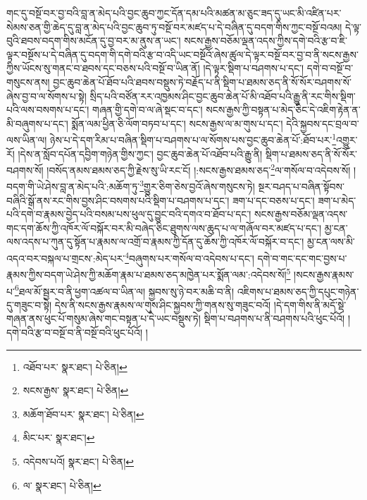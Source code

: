 གང་དུ་བསྔོ་བར་བྱ་བའི་བླ་ན་མེད་པའི་བྱང་ཆུབ་ཀྱང་དོན་དམ་པའི་མཚན་མ་ཅུང་ཟད་དུ་ཡང་མི་འཛིན་པར་སེམས་ཅན་གྱི་ཆེད་དུ་བླ་ན་མེད་པའི་བྱང་ཆུབ་ཏུ་བསྔོ་བར་མཛད་པ་དེ་བཞིན་དུ་བདག་གིས་ཀྱང་བསྔོ་བའམ། དེ་ལྟ་བུའི་ཐབས་བདག་གིས་མངོན་དུ་བྱ་བར་མ་ནུས་ན་ཡང་། སངས་རྒྱས་བཅོམ་ལྡན་འདས་ཀྱིས་དགེ་བའི་རྩ་བ་ཇི་ལྟར་བསྔོས་པ་དེ་བཞིན་དུ་བདག་གི་དགེ་བའི་རྩ་བ་འདི་ཡང་བསྔོའོ་ཞེས་ཚུལ་དེ་ལྟར་བསྔོ་བར་བྱ་བ་ནི་སངས་རྒྱས་ཀྱིས་ཡོངས་སུ་གནང་བ་ཐབས་དང་བཅས་པའི་བསྔོ་བ་ཡིན་ནོ། །དེ་ལྟར་སྡིག་པ་བཤགས་པ་དང་། དགེ་བ་བསྔོ་བ་གསུངས་ནས། བྱང་ཆུབ་ཆེན་པོ་ཐོབ་པའི་ཐབས་བསྡུས་ཏེ་བརྗོད་པ་ནི་སྡིག་པ་ཐམས་ཅད་ནི་སོ་སོར་བཤགས་སོ་ཞེས་བྱ་བ་ལ་སོགས་པ་སྟེ། སྲིད་པའི་བཙོན་རར་འཁྱམས་ཤིང་བྱང་ཆུབ་ཆེན་པོ་མི་འཐོབ་པའི་རྒྱུ་ནི་རང་གིས་སྡིག་པའི་ལས་བསགས་པ་དང་། གཞན་གྱི་དགེ་བ་ལ་ཞེ་སྡང་བ་དང་། སངས་རྒྱས་ཀྱི་བསྟན་པ་མེད་ཅིང་དེ་འཇིག་རྟེན་ན་མི་བཞུགས་པ་དང་། སྨོན་ལམ་ཕྱིན་ཅི་ལོག་བཏབ་པ་དང་། སངས་རྒྱས་ལ་མ་གུས་པ་དང་། དེའི་སྐྱབས་དང་བྲལ་བ་ལས་ཡིན་ལ། ཉེས་པ་དེ་དག་རིམ་པ་བཞིན་སྡིག་པ་བཤགས་པ་ལ་སོགས་པས་བྱང་ཆུབ་ཆེན་པོ་:ཐོབ་པར་\footnote{འཐོབ་པར་  སྣར་ཐང་།  པེ་ཅིན། }འགྱུར་རོ། །དེས་ན་སློབ་དཔོན་དབྱིག་གཉེན་གྱིས་ཀྱང་། བྱང་ཆུབ་ཆེན་པོ་འཐོབ་པའི་རྒྱུ་ནི། སྡིག་པ་ཐམས་ཅད་ནི་སོ་སོར་བཤགས་སོ། །བསོད་ནམས་ཐམས་ཅད་ཀྱི་རྗེས་སུ་ཡི་རང་ངོ། །:སངས་རྒྱས་ཐམས་ཅད་\footnote{སངས་རྒྱས་  སྣར་ཐང་།  པེ་ཅིན། }ལ་གསོལ་བ་འདེབས་སོ། །བདག་གི་ཡེ་ཤེས་བླ་ན་མེད་པའི་:མཆོག་ཏུ་\footnote{མཆོག་ཐོབ་པར་  སྣར་ཐང་།  པེ་ཅིན། }གྱུར་ཅིག་ཅེས་བྱའོ་ཞེས་གསུངས་ཏེ། སྔར་བཤད་པ་བཞིན་སྟོབས་བཞིའི་སྒོ་ནས་རང་གིས་བྱས་ཤིང་བསགས་པའི་སྡིག་པ་བཤགས་པ་དང་། ཟག་པ་དང་བཅས་པ་དང་། ཟག་པ་མེད་པའི་དགེ་བ་རྣམས་བྱེད་པའི་བསམ་པས་ཕུལ་དུ་བྱུང་བའི་དགའ་བ་ཐོབ་པ་དང་། སངས་རྒྱས་བཅོམ་ལྡན་འདས་གང་དག་ཆོས་ཀྱི་འཁོར་ལོ་བསྐོར་བར་མི་བཞེད་ཅིང་ཐུགས་ལས་ཆུད་པ་ལ་གཞོལ་བར་མཛད་པ་དང་། མྱ་ངན་ལས་འདས་པ་ཀུན་དུ་སྟོན་པ་རྣམས་ལ་འགྲོ་བ་རྣམས་ཀྱི་དོན་དུ་ཆོས་ཀྱི་འཁོར་ལོ་བསྐོར་བ་དང་། མྱ་ངན་ལས་མི་འདའ་བར་བསྐལ་པ་གྲངས་:མེད་པར་\footnote{མིང་པར་  སྣར་ཐང་། }བཞུགས་པར་གསོལ་བ་འདེབས་པ་དང་། དགེ་བ་གང་དང་གང་བྱས་པ་རྣམས་ཀྱིས་བདག་ཡེ་ཤེས་ཀྱི་མཆོག་རྣམ་པ་ཐམས་ཅད་མཁྱེན་པར་སྨོན་ལམ་:འདེབས་སོ།\footnote{འདེབས་པའོ།  སྣར་ཐང་།  པེ་ཅིན། } །སངས་རྒྱས་རྣམས་པ་\footnote{ལ་  སྣར་ཐང་།  པེ་ཅིན། }ཐལ་མོ་སྦྱར་བ་ནི་ཕྱག་འཚལ་བ་ཡིན་ལ། སྐྱབས་སུ་ཉེ་བར་མཆི་བ་ནི། འཇིགས་པ་ཐམས་ཅད་ཀྱི་དཔུང་གཉེན་དུ་གཟུང་བ་སྟེ། དེས་ནི་སངས་རྒྱས་རྣམས་ལ་གུས་ཤིང་སྐྱབས་ཀྱི་གནས་སུ་གཟུང་བའོ། །དེ་དག་གིས་ནི་མདོ་སྡེ་གཞན་ནས་ཕུང་པོ་གསུམ་ཞེས་གང་བསྟན་པ་དེ་ཡང་བསྡུས་ཏེ། སྡིག་པ་བཤགས་པ་ནི་བཤགས་པའི་ཕུང་པོའོ། །དགེ་བའི་རྩ་བ་བསྔོ་བ་ནི་བསྔོ་བའི་ཕུང་པོའོ། །
